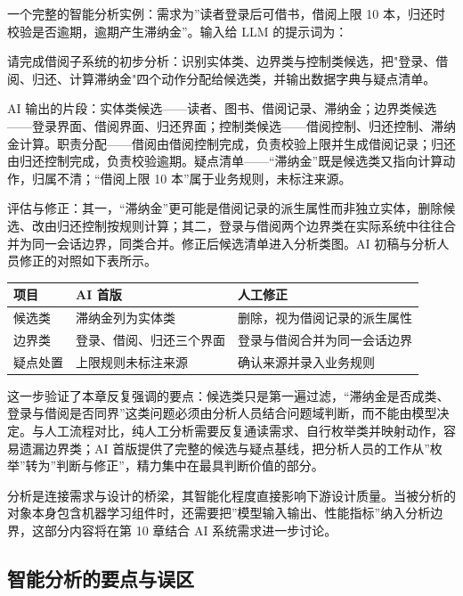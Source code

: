 \documentclass[12pt,a4paper,twoside,openany]{ctexbook}
\numberwithin{figure}{chapter}
\numberwithin{table}{chapter}
\newenvironment{Shaded}{}{}
\newcommand{\NormalTok}[1]{#1}
\newcounter{none}
\begin{document}
一个完整的智能分析实例：需求为''读者登录后可借书，借阅上限 10
本，归还时校验是否逾期，逾期产生滞纳金''。输入给 LLM 的提示词为：

\begin{Shaded}
\begin{Highlighting}[]
\NormalTok{请完成借阅子系统的初步分析：识别实体类、边界类与控制类候选，把"登录、借阅、归还、计算滞纳金"四个动作分配给候选类，并输出数据字典与疑点清单。}
\end{Highlighting}
\end{Shaded}

AI
输出的片段：实体类候选------读者、图书、借阅记录、滞纳金；边界类候选------登录界面、借阅界面、归还界面；控制类候选------借阅控制、归还控制、滞纳金计算。职责分配------借阅由借阅控制完成，负责校验上限并生成借阅记录；归还由归还控制完成，负责校验逾期。疑点清单------``滞纳金''既是候选类又指向计算动作，归属不清；``借阅上限
10 本''属于业务规则，未标注来源。

评估与修正：其一，``滞纳金''更可能是借阅记录的派生属性而非独立实体，删除候选、改由归还控制按规则计算；其二，登录与借阅两个边界类在实际系统中往往合并为同一会话边界，同类合并。修正后候选清单进入分析类图。AI
初稿与分析人员修正的对照如下表所示。

{\def\LTcaptype{none} %
\begin{longtable}[]{@{}lll@{}}
\toprule\noalign{}
项目 & AI 首版 & 人工修正 \\
\midrule\noalign{}
\endhead
\bottomrule\noalign{}
\endlastfoot
候选类 & 滞纳金列为实体类 & 删除，视为借阅记录的派生属性 \\
边界类 & 登录、借阅、归还三个界面 & 登录与借阅合并为同一会话边界 \\
疑点处置 & 上限规则未标注来源 & 确认来源并录入业务规则 \\
\end{longtable}
}

这一步验证了本章反复强调的要点：候选类只是第一遍过滤，``滞纳金是否成类、登录与借阅是否同界''这类问题必须由分析人员结合问题域判断，而不能由模型决定。与人工流程对比，纯人工分析需要反复通读需求、自行枚举类并映射动作，容易遗漏边界类；AI
首版提供了完整的候选与疑点基线，把分析人员的工作从''枚举''转为''判断与修正''，精力集中在最具判断价值的部分。

分析是连接需求与设计的桥梁，其智能化程度直接影响下游设计质量。当被分析的对象本身包含机器学习组件时，还需要把''模型输入输出、性能指标''纳入分析边界，这部分内容将在第
10 章结合 AI 系统需求进一步讨论。

\subsection{智能分析的要点与误区}\label{ux667aux80fdux5206ux6790ux7684ux8981ux70b9ux4e0eux8befux533a}
\end{document}
